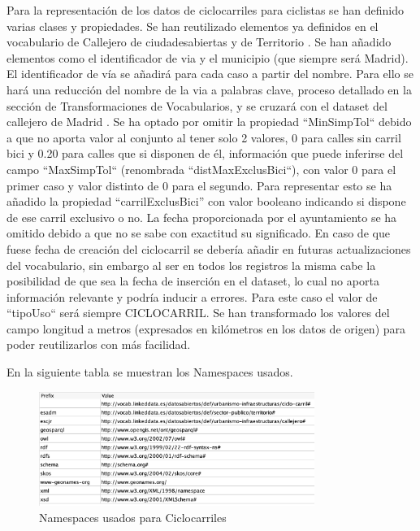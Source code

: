 Para la representación de los datos de ciclocarriles para ciclistas se han definido varias clases y propiedades. Se han reutilizado elementos ya definidos en el vocabulario de Callejero de ciudadesabiertas \cite{ciudadesbiertas_callejero} y de Territorio \cite{datoabiertos_municipio}.\newline
Se han añadido elementos como el identificador de via y el municipio (que siempre será Madrid).
El identificador de vía se añadirá para cada caso a partir del nombre. Para ello se hará una reducción del nombre de la via a palabras clave, proceso detallado en la sección de Transformaciones de Vocabularios, y se cruzará con el dataset del callejero de Madrid \cite{datosmadrid_callejero}.\newline
Se ha optado por omitir la propiedad ``MinSimpTol`` debido a que no aporta valor al conjunto al tener solo 2 valores, 0 para calles sin carril bici y 0.20 para calles que si disponen de él, información que puede inferirse del campo ``MaxSimpTol`` (renombrada ``distMaxExclusBici``), con valor 0 para el primer caso y valor distinto de 0 para el segundo. Para representar esto se ha añadido la propiedad “carrilExclusBici” con valor booleano indicando si dispone de ese carril exclusivo o no.\newline
La fecha proporcionada por el ayuntamiento se ha omitido debido a que no se sabe con exactitud su significado. En caso de que fuese fecha de creación del ciclocarril se debería añadir en futuras actualizaciones del vocabulario, sin embargo al ser en todos los registros la misma cabe la posibilidad de que sea la fecha de inserción en el dataset, lo cual no aporta información relevante y podría inducir a errores.\newline
Para este caso el valor de ``tipoUso`` será siempre CICLOCARRIL.\newline
Se han transformado los valores del campo longitud a metros (expresados en kilómetros en los datos de origen) para poder reutilizarlos con más facilidad.


\newpage
En la siguiente tabla se muestran los Namespaces usados.

\begin{figure}[h]
    \centering
        \includegraphics[angle=0, width=0.8\textwidth]{images/tablaIRIsCiclocarril.png}
    \caption{Namespaces usados para Ciclocarriles}
\end{figure}




